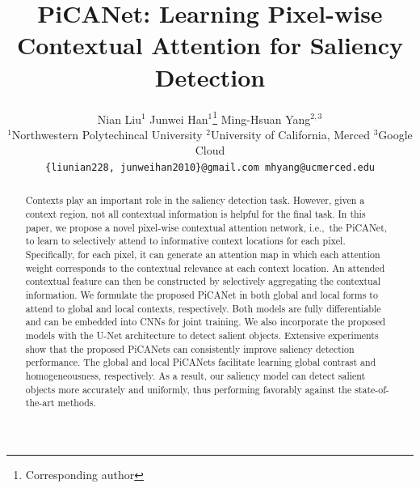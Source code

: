 \documentclass[10pt,twocolumn,letterpaper]{article}
\def\ie{i.e.,~} %
\begin{document}
\title{PiCANet: Learning Pixel-wise Contextual Attention for Saliency Detection}

\author{
	Nian Liu$^{1}$
	\hspace{25pt}
	Junwei Han$^{1}$\thanks{Corresponding author}
	\hspace{25pt}
	Ming-Hsuan Yang$^{2,3}$
	\\
	$^1$Northwestern Polytechincal University
	\hspace{8pt}
	$^2$University of California, Merced
	\hspace{8pt}
	$^3$Google Cloud
	\\
	{\tt\small 
    \{liunian228, junweihan2010\}@gmail.com
    \hspace{50pt}
    mhyang@ucmerced.edu
}
}

\maketitle
\thispagestyle{empty}
\pagestyle{empty}

\begin{abstract}
   Contexts play an important role in the saliency detection task. However, given a context region, not all contextual information is helpful for the final task. In this paper, we propose a novel pixel-wise contextual attention network, \ie the PiCANet, to learn to selectively attend to informative context locations for each pixel. Specifically, for each pixel, it can generate an attention map in which each attention weight corresponds to the contextual relevance at each context location.
 An attended contextual feature can then be constructed by selectively aggregating the contextual information.
   We formulate the proposed PiCANet in both global and local forms to attend to global and local contexts, respectively.
 Both models are fully differentiable and can be embedded into CNNs for joint training.
 We also incorporate the proposed models with the U-Net architecture to detect salient objects.
 Extensive experiments show that the proposed PiCANets can consistently improve saliency detection performance.
 The global and local PiCANets facilitate learning global contrast and homogeneousness, respectively.
 As a result, our saliency model can detect salient objects more accurately and uniformly, thus performing favorably against the state-of-the-art methods.
\end{abstract}
\vspace{-4mm}
\end{document}
